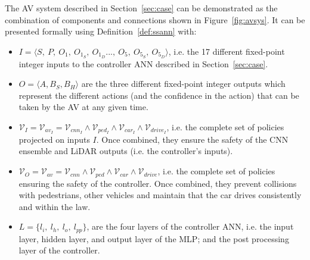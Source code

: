 The \ac{AV} system described in Section~\ref{sec:case} can be demonstrated as the combination of components and connections shown in Figure~\ref{fig:avsys}.
It can be presented formally using Definition~\ref{def:ssann} with:
\begin{itemize}
	\item $I=\langle S,~P,~O_{1},~O_{1_S},~O_{1_D}...,~O_{5},~O_{5_S},~O_{5_D} \rangle$, i.e. the 17 different fixed-point integer inputs to the controller \ac{ANN} described in Section~\ref{sec:case}.
	\item $O = \langle A, B_S, B_H \rangle$ are the three different fixed-point integer outputs which represent the different actions (and the confidence in the action) that can be taken by the \ac{AV} at any given time.
	\item $\mathcal{V}_I = \mathcal{V}_{av_I} = \mathcal{V}_{cnn_I} \wedge \mathcal{V}_{ped_I} \wedge \mathcal{V}_{car_I} \wedge \mathcal{V}_{drive_I}$, i.e. the complete set of policies projected on inputs $I$. Once combined, they ensure the safety of the \ac{CNN} ensemble and \ac{LiDAR} outputs (i.e. the controller's inputs).
	\item $\mathcal{V}_O = \mathcal{V}_{av} = \mathcal{V}_{cnn} \wedge \mathcal{V}_{ped} \wedge \mathcal{V}_{car} \wedge \mathcal{V}_{drive}$, i.e. the complete set of policies ensuring the safety of the controller. Once combined, they prevent collisions with pedestrians, other vehicles and maintain that the car drives consistently and within the law.
	\item $L = \{l_i,~l_h,~l_o,~l_{pp}\}$, are the four layers of the controller \ac{ANN}, i.e. the input layer, hidden layer, and output layer of the \ac{MLP}; and the post processing layer of the controller.
\end{itemize}


